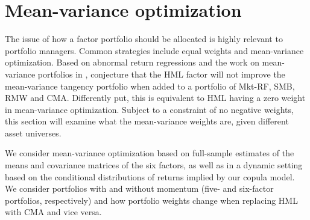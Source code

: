 
\section{Mean-variance optimization}
\label{sec:mean_variance}

The issue of how a factor portfolio should be allocated is highly relevant to portfolio managers. Common strategies include equal weights and mean-variance optimization. Based on abnormal return regressions and the work on mean-variance portfolios in \textcite{HubermanKandel1987}, \textcite{FF2015} conjecture that the HML factor will not improve the mean-variance tangency portfolio when added to a portfolio of Mkt-RF, SMB, RMW and CMA. Differently put, this is equivalent to HML having a zero weight in mean-variance optimization. Subject to a constraint of no negative weights, this section will examine what the mean-variance weights are, given different asset universes.

We consider mean-variance optimization based on full-sample estimates of the means and covariance matrices of the six factors, as well as in a dynamic setting based on the conditional distributions of returns implied by our copula model. We consider portfolios with and without momentum (five- and six-factor portfolios, respectively) and how portfolio weights change when replacing HML with CMA and vice versa.



